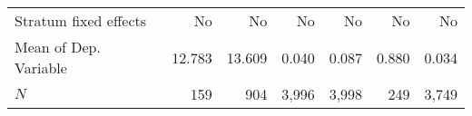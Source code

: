 \begin{tabular}{lrrrrrr}
\midrule
Stratum fixed effects      &       No &                       No &                                                   No &                                            No &                                                  No &                                                  No \\ 
Mean of Dep. Variable      &   12.783 &                   13.609 &                                                0.040 &                                         0.087 &                                               0.880 &                                               0.034 \\ 
$N$                        &      159 &                      904 &                                                3,996 &                                         3,998 &                                                 249 &                                               3,749 \\ 
\bottomrule
\end{tabular}
